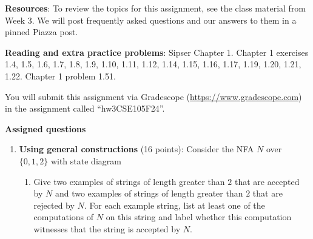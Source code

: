{\bf Resources}: To review the topics 
for this assignment, see the class material from Week 3.
We will post frequently asked questions and our answers to them in a 
pinned Piazza post. 

{\bf Reading and extra practice problems}:  
Sipser Chapter 1.
Chapter 1 exercises 1.4, 1.5, 1.6, 1.7, 1.8, 1.9, 1.10, 1.11, 1.12, 1.14, 1.15, 
1.16, 1.17, 1.19, 1.20, 1.21, 1.22. Chapter 1 problem 1.51.

\instructions

You will submit this assignment via Gradescope
(\href{https://www.gradescope.com}{https://www.gradescope.com}) 
in the assignment called ``hw3CSE105F24''.

{\bf Assigned questions}
\begin{enumerate}[wide, labelwidth=!, labelindent=0pt]

\item \textbf{Using general constructions} (16 points): Consider the NFA $N$ over $\{0,1,2\}$ with state diagram



    \begin{enumerate}
      \item\gradeCompleteFirst Give two examples of strings of length greater than $2$ 
      that are accepted by $N$ and two examples of strings of length greater than $2$ 
      that are rejected by $N$. For each example string, list at least one of the 
      computations of $N$ on this string and 
      label whether this computation witnesses that the string is accepted by $N$.


\end{enumerate}
\end{enumerate}
